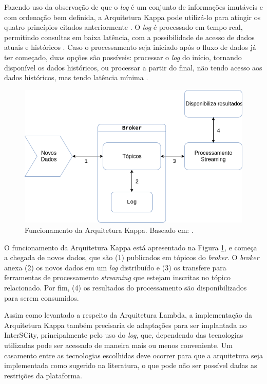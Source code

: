 Fazendo uso da observação de que o \textit{log} é um conjunto de informações
imutáveis e com ordenação bem definida, a Arquitetura Kappa pode utilizá-lo
para atingir os quatro princípios citados anteriormente \cite{kreps2014}. O
\textit{log} é processado em tempo real, permitindo consultas em baixa
latência, com a possibilidade de acesso de dados atuais e históricos
\cite{forgeat2015}. Caso o processamento seja iniciado após o fluxo de dados já
ter começado, duas opções são possíveis: processar o \textit{log} do início,
tornando disponível os dados históricos, ou processar a partir do final,
não tendo acesso aos dados históricos, mas tendo latência mínima
\cite{kreps2014}.

\begin{figure}
  \centering
    \includegraphics[scale=0.5]{figuras/kappa_architecture.png}
    \caption{Funcionamento da Arquitetura Kappa. Baseado em: .}
  \label{fig:kappa-lifecycle}
\end{figure}

O funcionamento da Arquitetura Kappa está apresentado na Figura
\ref{fig:kappa-lifecycle}, e começa a chegada de novos dados,
que são (1) publicados em tópicos do \textit{broker}. O \textit{broker} anexa
(2) os novos dados em um \textit{log} distribuído e (3) os transfere para
ferramentas de processamento \textit{streaming} que estejam inscritas no tópico
relacionado. Por fim, (4) os resultados do processamento são disponibilizados
para serem consumidos.

Assim como levantado a respeito da Arquitetura Lambda, a implementação da
Arquitetura Kappa também precisaria de adaptações para ser implantada no
InterSCity, principalmente pelo uso do \textit{log}, que, dependendo das
tecnologias utilizadas pode ser acessado de maneira mais ou menos conveniente.
Um casamento entre as tecnologias escolhidas deve ocorrer para que a
arquitetura seja implementada como sugerido na literatura, o que pode não ser
possível dadas as restrições da plataforma.

